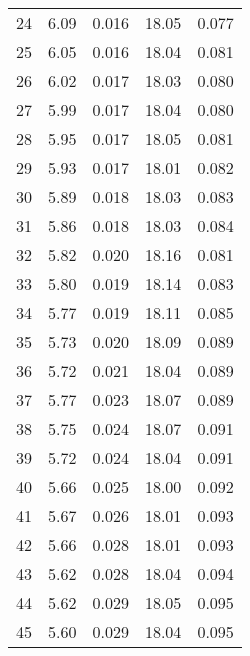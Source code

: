 \begin{table}
\begin{tabular}{c|ll|ll}
24 & 6.09 & 0.016 & 18.05 & 0.077 \\
25 & 6.05 & 0.016 & 18.04 & 0.081 \\
26 & 6.02 & 0.017 & 18.03 & 0.080 \\
27 & 5.99 & 0.017 & 18.04 & 0.080 \\
28 & 5.95 & 0.017 & 18.05 & 0.081 \\
29 & 5.93 & 0.017 & 18.01 & 0.082 \\
30 & 5.89 & 0.018 & 18.03 & 0.083 \\
31 & 5.86 & 0.018 & 18.03 & 0.084 \\
32 & 5.82 & 0.020 & 18.16 & 0.081 \\
33 & 5.80 & 0.019 & 18.14 & 0.083 \\
34 & 5.77 & 0.019 & 18.11 & 0.085 \\
35 & 5.73 & 0.020 & 18.09 & 0.089 \\
36 & 5.72 & 0.021 & 18.04 & 0.089 \\
37 & 5.77 & 0.023 & 18.07 & 0.089 \\
38 & 5.75 & 0.024 & 18.07 & 0.091 \\
39 & 5.72 & 0.024 & 18.04 & 0.091 \\
40 & 5.66 & 0.025 & 18.00 & 0.092 \\
41 & 5.67 & 0.026 & 18.01 & 0.093 \\
42 & 5.66 & 0.028 & 18.01 & 0.093 \\
43 & 5.62 & 0.028 & 18.04 & 0.094 \\
44 & 5.62 & 0.029 & 18.05 & 0.095 \\
45 & 5.60 & 0.029 & 18.04 & 0.095 \\
               \hline
        \end{tabular}
    \end{table}
    \clearpage


